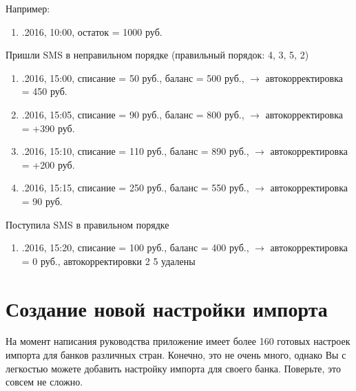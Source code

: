\documentclass[a4paper,10pt,russian]{sphinxmanual}
\begin{document}
\sphinxAtStartPar
Например:
\begin{enumerate}
%
\item {} 
.2016, 10:00, остаток = 1000 руб.

\end{enumerate}

\sphinxAtStartPar
Пришли SMS в неправильном порядке (правильный порядок: 4, 3, 5, 2)
\begin{enumerate}
%
\setcounter{enumi}{1}
\item {} 
.2016, 15:00, списание = \sphinxhyphen{}50 руб., баланс = 500 руб., \(\rightarrow\) автокорректировка = \sphinxhyphen{}450 руб.

\item {} 
.2016, 15:05, списание = \sphinxhyphen{}90 руб., баланс = 800 руб., \(\rightarrow\) автокорректировка = +390 руб.

\item {} 
.2016, 15:10, списание = \sphinxhyphen{}110 руб., баланс = 890 руб., \(\rightarrow\) автокорректировка = +200 руб.

\item {} 
.2016, 15:15, списание = \sphinxhyphen{}250 руб., баланс = 550 руб., \(\rightarrow\) автокорректировка = \sphinxhyphen{}90 руб.

\end{enumerate}

\sphinxAtStartPar
Поступила SMS в правильном порядке
\begin{enumerate}
%
\setcounter{enumi}{5}
\item {} 
.2016, 15:20, списание = \sphinxhyphen{}100 руб., баланс = 400 руб., \(\rightarrow\) автокорректировка = 0 руб., автокорректировки 2 \sphinxhyphen{} 5 удалены

\end{enumerate}


\section{Создание новой настройки импорта}
\label{\detokenize{notifications:id2}}
\sphinxAtStartPar
На момент написания руководства приложение имеет более 160 готовых настроек импорта для банков различных стран.
Конечно, это не очень много, однако Вы с легкостью можете добавить настройку импорта для своего банка.
Поверьте, это совсем не сложно.
\end{document}
